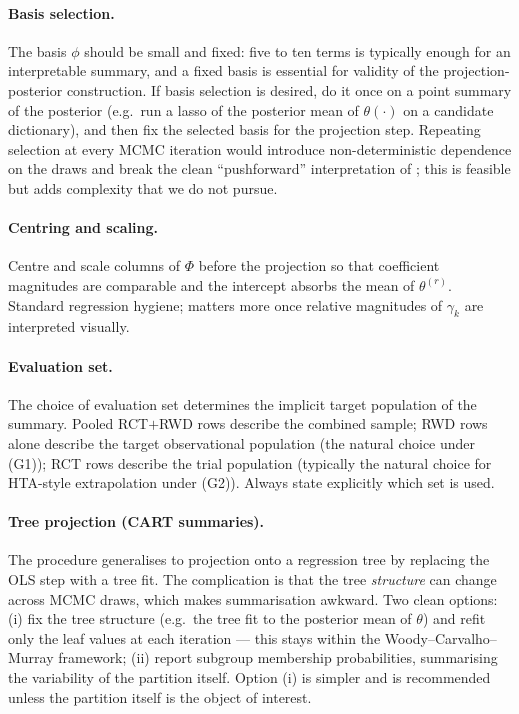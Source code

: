 \documentclass[11pt]{article}
\begin{document}
\paragraph{Basis selection.} The basis $\phi$ should be small and fixed:
five to ten terms is typically enough for an interpretable summary, and a
fixed basis is essential for validity of the projection-posterior
construction. If basis selection is desired, do it once on a point summary
of the posterior (e.g.\ run a lasso of the posterior mean of $\theta(\cdot)$
on a candidate dictionary), and then fix the selected basis for the
projection step. Repeating selection at every MCMC iteration would
introduce non-deterministic dependence on the draws and break the clean
``pushforward'' interpretation of \citet{Woody2020}; this is feasible but
adds complexity that we do not pursue.

\paragraph{Centring and scaling.} Centre and scale columns of $\Phi$ before
the projection so that coefficient magnitudes are comparable and the
intercept absorbs the mean of $\theta^{(r)}$. Standard regression hygiene;
matters more once relative magnitudes of $\gamma_{k}$ are interpreted
visually.

\paragraph{Evaluation set.} The choice of evaluation set determines the
implicit target population of the summary. Pooled RCT$+$RWD rows describe
the combined sample; RWD rows alone describe the target observational
population (the natural choice under (G1)); RCT rows describe the trial
population (typically the natural choice for HTA-style extrapolation under
(G2)). Always state explicitly which set is used.

\paragraph{Tree projection (CART summaries).} The procedure generalises
to projection onto a regression tree by replacing the OLS step with a
tree fit. The complication is that the tree \emph{structure} can change
across MCMC draws, which makes summarisation awkward. Two clean options:
(i) fix the tree structure (e.g.\ the tree fit to the posterior mean of
$\theta$) and refit only the leaf values at each iteration --- this stays
within the Woody--Carvalho--Murray framework; (ii) report subgroup
membership probabilities, summarising the variability of the partition
itself. Option (i) is simpler and is recommended unless the partition
itself is the object of interest.
\end{document}
